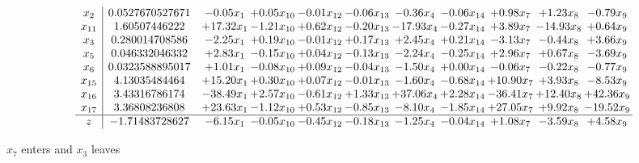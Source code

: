 \documentclass[9pt]{article}
\begin{document}
 \[\begin{array}{c| c c@{\hskip 2pt} c@{\hskip 2pt} c@{\hskip 2pt} c@{\hskip 2pt} c@{\hskip 2pt} c@{\hskip 2pt} c@{\hskip 2pt} c@{\hskip 2pt} c@{\hskip 2pt} }
 x_{2}   &  0.0527670527671 & -0.05 x_{1} & +  0.05 x_{10} & -0.01 x_{12} & -0.06 x_{13} & -0.36 x_{4} & -0.06 x_{14} & +  0.98 x_{7} & +  1.23 x_{8} & -0.79 x_{9}\\
 x_{11}   &  1.60507446222 & + 17.32 x_{1} & -1.21 x_{10} & +  0.62 x_{12} & -0.20 x_{13} & -17.93 x_{4} & -0.27 x_{14} & +  3.89 x_{7} & -14.93 x_{8} & +  0.64 x_{9}\\
 x_{3}   &  0.280014708586 & -2.25 x_{1} & +  0.19 x_{10} & -0.01 x_{12} & +  0.17 x_{13} & +  2.45 x_{4} & +  0.21 x_{14} & -3.13 x_{7} & -0.44 x_{8} & +  3.66 x_{9}\\
 x_{5}   &  0.046332046332 & +  2.83 x_{1} & -0.15 x_{10} & +  0.04 x_{12} & -0.13 x_{13} & -2.24 x_{4} & -0.25 x_{14} & +  2.96 x_{7} & +  0.67 x_{8} & -3.69 x_{9}\\
 x_{6}   &  0.0323588895017 & +  1.01 x_{1} & -0.08 x_{10} & +  0.09 x_{12} & -0.04 x_{13} & -1.50 x_{4} & +  0.00 x_{14} & -0.06 x_{7} & -0.22 x_{8} & -0.77 x_{9}\\
 x_{15}   &  4.13035484464 & + 15.20 x_{1} & +  0.30 x_{10} & +  0.07 x_{12} & -0.01 x_{13} & -1.60 x_{4} & -0.68 x_{14} & + 10.90 x_{7} & +  3.93 x_{8} & -8.53 x_{9}\\
 x_{16}   &  3.43316786174 & -38.49 x_{1} & +  2.57 x_{10} & -0.61 x_{12} & +  1.33 x_{13} & + 37.06 x_{4} & +  2.28 x_{14} & -36.41 x_{7} & + 12.40 x_{8} & + 42.36 x_{9}\\
 x_{17}   &  3.36808236808 & + 23.63 x_{1} & -1.12 x_{10} & +  0.53 x_{12} & -0.85 x_{13} & -8.10 x_{4} & -1.85 x_{14} & + 27.05 x_{7} & +  9.92 x_{8} & -19.52 x_{9}\\
\hline
z    &  -1.71483728627 & -6.15 x_{1} & -0.05 x_{10} & -0.45 x_{12} & -0.18 x_{13} & -1.25 x_{4} & -0.04 x_{14} & +  1.08 x_{7} & -3.59 x_{8} & +  4.58 x_{9}\\
\end{array}\]


 $ x_{7} $ enters and $ x_{3} $ leaves 
\end{document}

